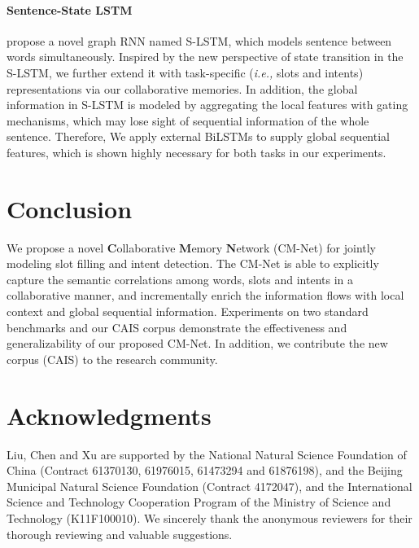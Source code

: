 \documentclass[11pt,a4paper]{article}
\begin{document}
\paragraph{Sentence-State LSTM}
\citeauthor{SLSTM_2018} \citeyear{SLSTM_2018} propose a novel graph RNN named S-LSTM, which models sentence between words simultaneously. Inspired by the new perspective of state transition in the S-LSTM, we further extend it with task-specific ({\em i.e., } slots and intents) representations via our collaborative memories. In addition, the global information in S-LSTM is modeled by aggregating the local features with gating mechanisms, which may lose sight of sequential information of the whole sentence. Therefore, We apply external BiLSTMs to supply global sequential features, which is shown highly necessary for both tasks in our experiments.

\section{Conclusion}
We propose a novel $\mathbf{C}$ollaborative $\mathbf{M}$emory $\mathbf{N}$etwork (CM-Net) for jointly modeling slot filling and intent detection. The CM-Net is able to explicitly capture the semantic correlations among words, slots and intents in a collaborative manner, and incrementally enrich the information flows with local context and global sequential information.
Experiments on two standard benchmarks and our CAIS corpus demonstrate the effectiveness and generalizability of our proposed CM-Net. In addition, we contribute the new corpus (CAIS) to the research community.



\section*{Acknowledgments}
Liu, Chen and Xu are supported by the National Natural Science Foundation of China (Contract 61370130, 61976015, 61473294 and 61876198), and the Beijing Municipal Natural Science Foundation (Contract 4172047), and the International Science and Technology Cooperation Program of the Ministry of Science and Technology (K11F100010). We sincerely thank the anonymous reviewers for their thorough reviewing and valuable suggestions.






\appendix
\end{document}
